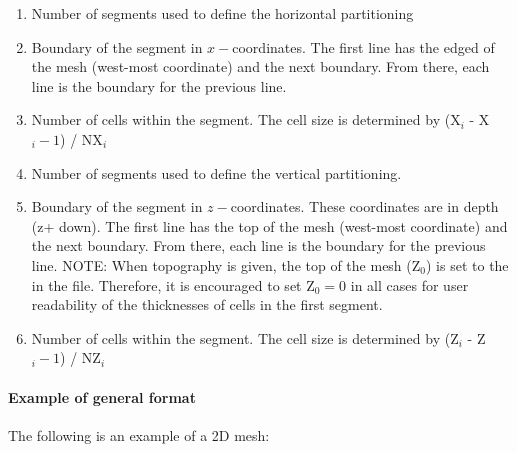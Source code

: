 \begin{enumerate}
\item[\codeName{N$_x$}] Number of segments used to define the horizontal partitioning
\item[\codeName{X$_i$}] Boundary of the segment in $x-$coordinates. The first line has the edged of the mesh (west-most coordinate) and the next boundary. From there, each line is the boundary for the previous line.
\item[\codeName{NX$_i$ }] Number of cells within the segment. The cell size is determined by (X$_{i}$ - X$_i-1$) / NX$_i$
\item[\codeName{N$_z$}] Number of segments used to define the vertical partitioning.
\item[\codeName{Z$_i$}] Boundary of the segment in $z-$coordinates. These coordinates are in depth (z+ down). The first line has the top of the mesh (west-most coordinate) and the next boundary. From there, each line is the boundary for the previous line. NOTE: When topography is given, the top of the mesh (Z$_0$) is set to the  in the  file. Therefore, it is encouraged to set Z$_0 = 0$ in all cases for user readability of the thicknesses of cells in the first segment. 
\item[\codeName{NZ$_i$ }] Number of cells within the segment. The cell size is determined by (Z$_{i}$ - Z$_i-1$) / NZ$_i$
\end{enumerate}

\paragraph{Example of general format} 

The following is an example of a 2D mesh:

